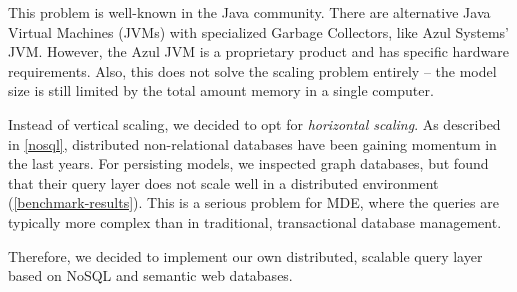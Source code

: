 This problem is well-known in the Java community. There are alternative Java Virtual Machines (JVMs) with specialized Garbage Collectors, like Azul Systems' JVM. However, the Azul JVM is a proprietary product and has specific hardware requirements. Also, this does not solve the scaling problem entirely -- the model size is still limited by the total amount memory in a single computer.

Instead of vertical scaling, we decided to opt for \emph{horizontal scaling}. As described in \autoref{nosql}, distributed non-relational databases have been gaining momentum in the last years. For persisting models, we inspected graph databases, but found that their query layer does not scale well in a distributed environment (\autoref{benchmark-results}). This is a serious problem for MDE, where the queries are typically more complex than in traditional, transactional database management.

Therefore, we decided to implement our own distributed, scalable query layer based on NoSQL and semantic web databases.

